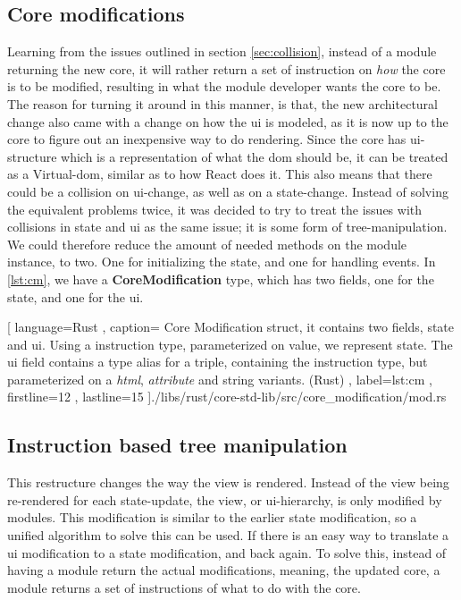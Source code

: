 \subsection{Core modifications}

Learning from the issues outlined in section \ref{sec:collision}, instead of a
module returning the new core, it will rather return a set of instruction on
\textit{how} the core is to be modified, resulting in what the module developer
wants the core to be. The reason for turning it around in this manner, is that,
the new architectural change also came with a change on how the \gls*{ui} is
modeled, as it is now up to the core to figure out an inexpensive way to do
rendering. Since the core has \gls*{ui}-structure which is a representation of
what the \gls*{dom} should be, it can be treated as a Virtual-\gls*{dom}, similar
as to how React does it. This also means that there could be a collision on
\gls*{ui}-change, as well as on a state-change. Instead of solving the equivalent
problems twice, it was decided to try to treat the issues with collisions in
state and \gls*{ui} as the same issue; it is some form of tree-manipulation. We
could therefore reduce the amount of needed methods on the module instance, to
two. One for initializing the state, and one for handling events. In
\ref{lst:cm}, we have a \textbf{CoreModification} type, which has two fields,
one for the state, and one for the \gls*{ui}.

\begin{center}
  
    [ language=Rust
    , caption={
      Core Modification struct, it contains two fields, state and ui. Using a
      instruction type, parameterized on value, we represent state. The ui field
      contains a type alias for a triple, containing the instruction type, but
      parameterized on a \textit{html}, \textit{attribute} and string variants.
      (Rust)
    }
    , label=lst:cm
    , firstline=12
    , lastline=15
    ]{./libs/rust/core-std-lib/src/core_modification/mod.rs}
\end{center}


\subsection{Instruction based tree manipulation}

This restructure changes the way the view is rendered. Instead of the view being
re-rendered for each state-update, the view, or \gls*{ui}-hierarchy, is only
modified by modules. This modification is similar to the earlier state
modification, so a unified algorithm to solve this can be used. If there is an
easy way to translate a \gls*{ui} modification to a state modification, and back
again. To solve this, instead of having a module return the actual
modifications, meaning, the updated core, a module returns a set of instructions
of what to do with the core.

